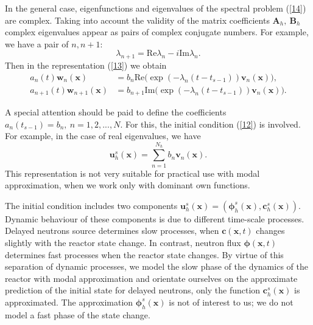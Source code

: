\documentclass[authoryear]{elsarticle}
\begin{document}
In the general case, eigenfunctions and eigenvalues of the spectral problem  (\ref{14}) are complex.
Taking into account the validity of the matrix coefficients  $\bm A_h, \ \bm B_h$ complex eigenvalues appear as pairs of complex conjugate numbers. For example, we have a pair of $n,n+1$: 
\[
 \lambda_{n+1} = \mathrm{Re} \lambda_n - i \mathrm{Im} \lambda_n . 
\] 
Then in the representation  (\ref{13}) we obtain
\[
\begin{split}
 a_n(t) \bm w_n(\bm x) & = b_n \mathrm{Re} \big ( \exp(-\lambda_n (t-t_{s-1})) \bm v_n(\bm x) \big ), \\
 a_{n+1}(t) \bm w_{n+1}(\bm x) & = b_{n+1} \mathrm{Im} \big ( \exp(-\lambda_n (t-t_{s-1})) \bm v_n(\bm x) \big ) .
\end{split}
\] 

A special attention should be paid to define the coefficients $a_n(t_{s-1}) = b_n, \ n = 1,2, ..., N$.
For this, the initial condition (\ref{12}) is involved. For example, in the case of real eigenvalues, we have
\[
 \bm u_h^s (\bm x) = \sum_{n=1}^{N_h} b_n \bm v_n(\bm x) .
\] 
This representation is not very suitable for practical use with modal approximation, when we work only with dominant own functions.  

The initial condition includes two components  $\bm u_h^s (\bm x) = (\bm \phi_h^s (\bm x), \bm c_h^s (\bm x))$.
Dynamic behaviour of these components is due to different time-scale processes. Delayed neutrons source determines slow processes, when  $\bm c(\bm x,t)$ changes slightly with the reactor state change. In contrast, neutron flux $\bm \phi(\bm x,t)$ determines fast processes when the reactor state changes. By virtue of this separation of dynamic processes, we model the slow phase of the dynamics of the reactor with modal approximation and orientate ourselves on the approximate prediction of the initial state for delayed neutrons, only the function  $\bm c_h^s (\bm x)$ is approximated. The approximation  $\bm \phi_h^s (\bm x)$ is not of interest to us; we do not model a fast phase of the state change.
\end{document}
